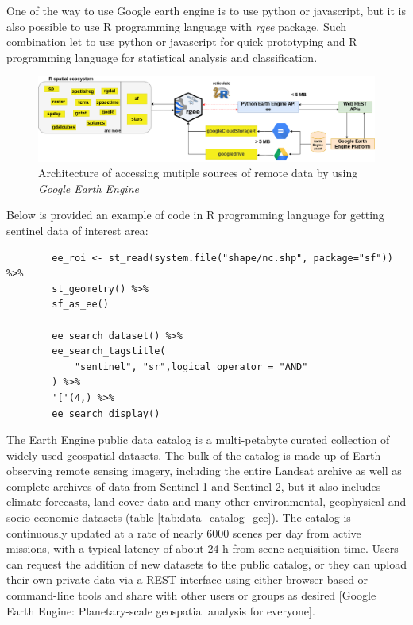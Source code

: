 	One of the way to use Google earth engine is to use python or javascript, but it is also possible to use R programming language with \textit{rgee} package. Such combination let to use python or javascript for quick prototyping and R programming language for statistical analysis and classification.
	
	\begin{figure}[H]
		\centering
		\includegraphics[width=1.0\linewidth]{images/gee.png}
		\caption{Architecture of accessing mutiple sources of remote data by using \textit{Google Earth Engine}}
		\label{fig:gee}
	\end{figure}
	
	Below is provided an example of code  in R programming language for getting sentinel data of interest area:
	
	\begin{lstlisting}
		ee_roi <- st_read(system.file("shape/nc.shp", package="sf")) %>%
		st_geometry() %>%
		sf_as_ee()
		
		ee_search_dataset() %>% 
		ee_search_tagstitle(
			"sentinel", "sr",logical_operator = "AND"
		) %>% 
		'['(4,) %>%
		ee_search_display()
	\end{lstlisting}
	
	The Earth Engine public data catalog is a multi-petabyte curated collection of widely used geospatial datasets. The bulk of the catalog is made up of Earth-observing remote sensing imagery, including the entire Landsat archive as well as complete archives of data from Sentinel-1 and Sentinel-2, but it also includes climate forecasts, land cover data and many other environmental, geophysical and socio-economic datasets (table \ref{tab:data_catalog_gee}). The catalog is continuously updated at a rate of nearly 6000 scenes per day from active missions, with a typical latency of about 24 h from scene acquisition time. Users can request the addition of new datasets to the public catalog, or they can upload their own private data via a REST interface using either browser-based or command-line tools and share with other users or groups as desired [Google Earth Engine: Planetary-scale geospatial analysis for everyone].
	
